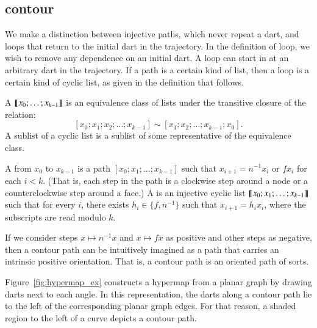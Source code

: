 \subsection{contour}

We make a distinction between injective paths, which never
repeat a dart, and loops that return to the initial dart in the trajectory.
In the definition of loop, we wish to remove any dependence on an initial dart.
A loop can start in at an arbitrary dart in the trajectory.  If a path is a certain
kind of list, then a loop is a certain kind of cyclic list, as given in the
definition that follows.

\begin{definition}
   
  A  ${\llbracket{x_0;\ldots;x_{k-1}}\rrbracket}$ is an equivalence
  class of lists under the transitive closure of the relation:
\[ 
[x_0;x_1;x_2;\ldots;x_{k-1}] \sim [x_1;x_2;\ldots;x_{k-1};x_0].
\] 
A sublist of a cyclic list is a sublist of some representative of the
equivalence class.
\end{definition}

\begin{definition}
 A  from
$x_0$ to $x_{k-1}$ is a path $[x_0;x_1;\ldots;x_{k-1}]$ such that
$x_{i+1} = n^{-1} x_i$ or $f x_i$ for each $i<k$.  (That is, each
step in the path is a clockwise step around a node or a
counterclockwise step around a face.)  
A  is an injective cyclic list
${\llbracket{x_0;x_1;\ldots;x_{k-1}}\rrbracket}$ such that
for every $i$, there exists $h_i\in \{f,n^{-1}\}$ such that $x_{i+1} = h_i x_i$, 
where the subscripts are
read modulo $k$.
%
%
%
\end{definition}


If we consider steps $x\mapsto n^{-1} x$ and $x\mapsto f x $ as
positive and other steps as negative, then a contour path can be
intuitively imagined as a path that carries an intrinsic positive
orientation.  That is, a contour path is an oriented path of sorts.



\begin{remark}
 Figure~\ref{fig:hypermap_ex}
  constructs a hypermap from a planar graph by drawing darts next to
  each angle.  In this representation, the darts along a contour path
  lie to the left of the corresponding planar graph edges.  For that
  reason, a shaded region to the left of a curve depicts a contour
  path.
\end{remark}

